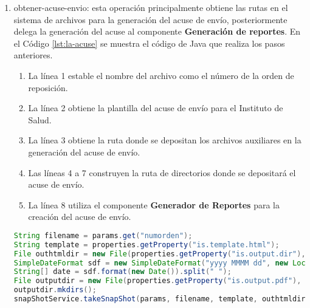 \begin{enumerate}
	\item obtener-acuse-envio: esta operación principalmente obtiene las rutas en el sistema de archivos para la generación del acuse de envío, posteriormente delega la generación del acuse al componente \textbf{Generación de reportes}. En el Código \ref{lst:la-acuse} se muestra el código de Java que realiza los pasos anteriores.
	\begin{enumerate}
		\item La línea 1 estable el nombre del archivo como el número de la orden de reposición.
		\item La línea 2 obtiene la plantilla del acuse de envío para el Instituto de Salud.
		\item La línea 3 obtiene la ruta donde se depositan los archivos auxiliares en la generación del acuse de envío.
		\item Las líneas 4 a 7 construyen la ruta de directorios donde se depositará el acuse de envío.
		\item La línea 8 utiliza el componente \textbf{Generador de Reportes} para la creación del acuse de envío.
	\end{enumerate}
	\begin{lstlisting}[language=Java, caption={Generación del acuse de envío.}, captionpos=b, label={lst:la-acuse}]
String filename = params.get("numorden");
String template = properties.getProperty("is.template.html");
File outhtmldir = new File(properties.getProperty("is.output.dir"), filename + ".html");
SimpleDateFormat sdf = new SimpleDateFormat("yyyy MMMM dd", new Locale("es", "MX"));
String[] date = sdf.format(new Date()).split(" ");
File outputdir = new File(properties.getProperty("is.output.pdf"), String.format(REPORT_DIR_TMPL, date[0], date[1], date[2]));
outputdir.mkdirs();
snapShotService.takeSnapShot(params, filename, template, outhtmldir, outputdir);
	\end{lstlisting}
\end{enumerate}

